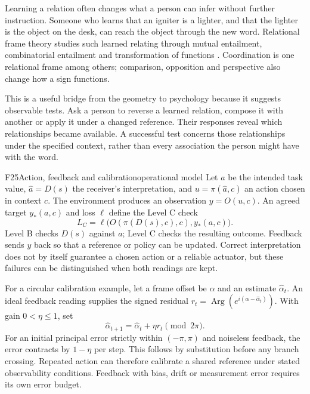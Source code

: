 \documentclass[11pt,a4paper]{article}
\DeclareMathOperator{\Arg}{Arg}
\begin{document}
Learning a relation often changes what a person can infer without further
instruction. Someone who learns that an igniter is a lighter, and that the
lighter is the object on the desk, can reach the object through the new word.
Relational frame theory studies such learned relating through mutual
entailment, combinatorial entailment and transformation of functions
\citep{Hayes2001,ACBS}. Coordination is one relational frame among others;
comparison, opposition and perspective also change how a sign functions.

This is a useful bridge from the geometry to psychology because it suggests
observable tests. Ask a person to reverse a learned relation, compose it with
another or apply it under a changed reference. Their responses reveal which
relationships became available. A successful test concerns those relationships
under the specified context, rather than every association the person might
have with the word.

\begin{formal}{F25}{Action, feedback and calibration}{operational model}
Let $a$ be the intended task value, $\hat a=D(s)$ the receiver's
interpretation, and $u=\pi(\hat a,c)$ an action chosen in context $c$.
The environment produces an observation $y=O(u,c)$. An agreed target
$y_*(a,c)$ and loss $\ell$ define the Level C check
\begin{equation}
 L_C=\ell\bigl(O(\pi(D(s),c),c),y_*(a,c)\bigr).
\end{equation}
Level B checks $D(s)$ against $a$; Level C checks the resulting outcome.
Feedback sends $y$ back so that a reference or policy can be updated. Correct
interpretation does not by itself guarantee a chosen action or a reliable
actuator, but these failures can be distinguished when both readings are kept.

For a circular calibration example, let a frame offset be $\alpha$ and an
estimate $\hat\alpha_t$. An ideal feedback reading supplies the signed residual
$r_t=\Arg(e^{i(\alpha-\hat\alpha_t)})$. With gain $0<\eta\leq1$, set
\begin{equation}
 \hat\alpha_{t+1}=\hat\alpha_t+\eta r_t\pmod{2\pi}.
\end{equation}
For an initial principal error strictly within $(-\pi,\pi)$ and noiseless
feedback, the error contracts by $1-\eta$ per step. This follows by
substitution before any branch crossing. Repeated action can therefore
calibrate a shared reference under stated observability conditions. Feedback
with bias, drift or measurement error requires its own error budget.
\end{formal}
\end{document}
